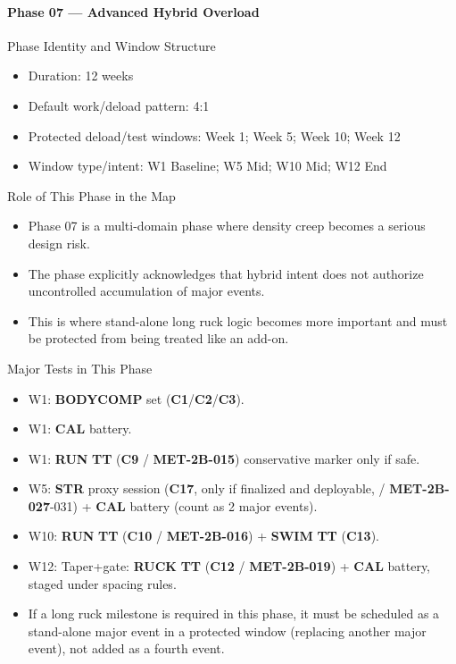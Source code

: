 \documentclass[10pt]{article}
\begin{document}
\newpage
\paragraph*{Phase 07 — Advanced Hybrid Overload}

Phase Identity and Window Structure

\begin{itemize}
\item Duration: 12 weeks
\item Default work/deload pattern: 4:1
\item Protected deload/test windows: Week 1; Week 5; Week 10; Week 12
\item Window type/intent: W1 Baseline; W5 Mid; W10 Mid; W12 End
\end{itemize}

Role of This Phase in the Map

\begin{itemize}
\item Phase 07 is a multi-domain phase where density creep becomes a serious design risk.
\item The phase explicitly acknowledges that hybrid intent does not authorize uncontrolled accumulation of major events.
\item This is where stand-alone long ruck logic becomes more important and must be protected from being treated like an add-on.
\end{itemize}

Major Tests in This Phase

\begin{itemize}
\item W1: \textbf{BODYCOMP} set (\textbf{C1}/\textbf{C2}/\textbf{C3}).
\item W1: \textbf{CAL} battery.
\item W1: \textbf{RUN} \textbf{TT} (\textbf{C9} / \textbf{MET-2B-015}) conservative marker only if safe.
\item W5: \textbf{STR} proxy session (\textbf{C17}, only if finalized and deployable, / \textbf{MET-2B-027}-031) + \textbf{CAL} battery (count as 2 major events).
\item W10: \textbf{RUN} \textbf{TT} (\textbf{C10} / \textbf{MET-2B-016}) + \textbf{SWIM} \textbf{TT} (\textbf{C13}).
\item W12: Taper+gate: \textbf{RUCK} \textbf{TT} (\textbf{C12} / \textbf{MET-2B-019}) + \textbf{CAL} battery, staged under spacing rules.
\item If a long ruck milestone is required in this phase, it must be scheduled as a stand-alone major event in a protected window (replacing another major event), not added as a fourth event.
\end{itemize}
\end{document}
